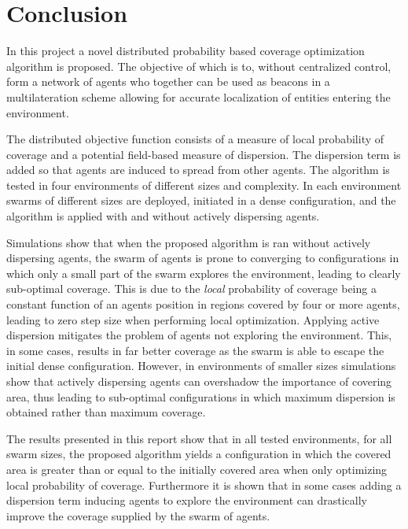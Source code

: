 \section{Conclusion}
In this project a novel distributed probability based coverage optimization algorithm is proposed. The objective of which
is to, without centralized control, form a network of agents who together can be used as beacons in a 
multilateration scheme allowing for accurate localization of entities entering the environment.

The distributed objective function consists of a measure of local probability of coverage and a potential field-based measure
of dispersion. The dispersion term is added so that agents are induced to spread from other agents.
The algorithm is tested in four environments of different sizes and complexity. In each environment swarms of different sizes
are deployed, initiated in a dense configuration, and the algorithm is applied with and without actively dispersing agents.

Simulations show that when the proposed algorithm is ran without actively dispersing agents, the swarm of agents
is prone to converging to configurations in which only a small part of the swarm explores the environment, leading to 
clearly sub-optimal coverage. 
This is due to the \textit{local} probability of coverage being a constant function of an agents position in regions covered by four or more agents, 
leading to zero step size when performing local optimization.
Applying active dispersion mitigates the problem of agents not exploring the environment. This, in some cases, results in far better 
coverage as the swarm is able to escape the initial dense configuration.
However, in environments of smaller sizes simulations show that actively dispersing agents can overshadow the importance of covering area, thus 
leading to sub-optimal configurations in which maximum dispersion is obtained rather than maximum coverage.

The results presented in this report show that in all tested environments, for all swarm sizes, the proposed algorithm yields
a configuration in which the covered area is greater than or equal to the initially covered area when only optimizing local probability of coverage. 
Furthermore it is shown that in some cases adding a dispersion term inducing agents to explore the environment can drastically improve the coverage supplied
by the swarm of agents.